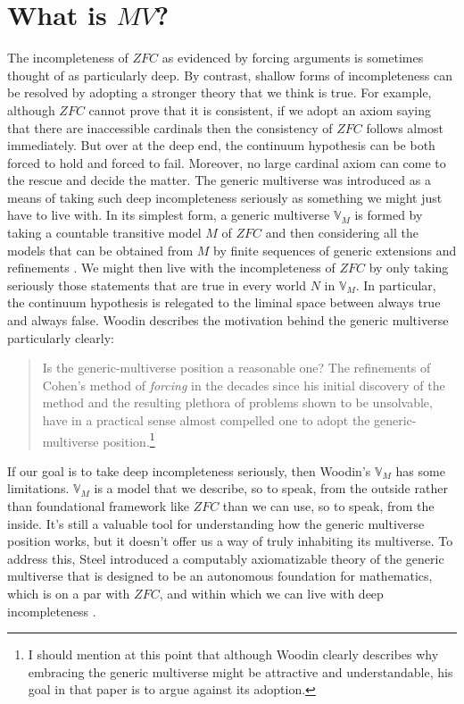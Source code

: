\documentclass[10pt,a4paper]{amsart}
\numberwithin{equation}{section}
\numberwithin{figure}{section}
\theoremstyle{plain}
\theoremstyle{plain}
\theoremstyle{plain}
\theoremstyle{plain}
\theoremstyle{remark}
\theoremstyle{plain}
\theoremstyle{definition}
\begin{document}
\section{What is $MV$?\label{sec:What-is-?}}

The incompleteness of $ZFC$ as evidenced by forcing arguments is
sometimes thought of as particularly deep. By contrast, shallow forms
of incompleteness can be resolved by adopting a stronger theory that
we think is true. For example, although $ZFC$ cannot prove that it
is consistent, if we adopt an axiom saying that there are inaccessible
cardinals then the consistency of $ZFC$ follows almost immediately.
But over at the deep end, the continuum hypothesis can be both forced
to hold and forced to fail. Moreover, no large cardinal axiom can
come to the rescue and decide the matter. The generic multiverse was
introduced as a means of taking such deep incompleteness seriously
as something we might just have to live with. In its simplest form,
a generic multiverse $\mathbb{V}_{M}$ is formed by taking a countable
transitive model $M$ of $ZFC$ and then considering all the models
that can be obtained from $M$ by finite sequences of generic extensions
and refinements \citep{WoodinGM}. We might then live with the incompleteness
of $ZFC$ by only taking seriously those statements that are true
in every world $N$ in $\mathbb{V}_{M}$. In particular, the continuum
hypothesis is relegated to the liminal space between always true and
always false. Woodin describes the motivation behind the generic multiverse
particularly clearly:
\begin{quote}
Is the generic-multiverse position a reasonable one? The refinements
of Cohen's method of \emph{forcing} in the decades since his initial
discovery of the method and the resulting plethora of problems shown
to be unsolvable, have in a practical sense almost compelled one to
adopt the generic-multiverse position.\footnote{I should mention at this point that although Woodin clearly describes
why embracing the generic multiverse might be attractive and understandable,
his goal in that paper is to argue against its adoption.} \citep{WoodinGM}
\end{quote}
If our goal is to take deep incompleteness seriously, then Woodin's
$\mathbb{V}_{M}$ has some limitations. $\mathbb{V}_{M}$ is a model
that we describe, so to speak, from the outside rather than foundational
framework like $ZFC$ than we can use, so to speak, from the inside.
It's still a valuable tool for understanding how the generic multiverse
position works, but it doesn't offer us a way of truly inhabiting
its multiverse. To address this, Steel introduced a computably axiomatizable
theory of the generic multiverse that is designed to be an autonomous
foundation for mathematics, which is on a par with $ZFC$, and within
which we can live with deep incompleteness \citep{SteelGP}.
\end{document}
